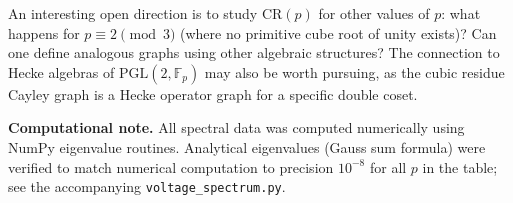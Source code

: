 \documentclass[11pt,a4paper]{article}
\theoremstyle{plain}
\theoremstyle{definition}
\theoremstyle{remark}
\newcommand{\F}{\mathbb{F}}
\newcommand{\CR}{\mathrm{CR}}
\begin{document}
An interesting open direction is to study $\CR(p)$ for other values of $p$:
what happens for $p \equiv 2 \pmod{3}$ (where no primitive cube root of unity
exists)? Can one define analogous graphs using other algebraic structures?
The connection to Hecke algebras of $\mathrm{PGL}(2, \F_p)$ may also be
worth pursuing, as the cubic residue Cayley graph is a Hecke operator graph
for a specific double coset.

\bigskip

{\raggedright\noindent\textbf{Computational note.}
All spectral data was computed numerically using NumPy eigenvalue routines.
Analytical eigenvalues (Gauss sum formula) were verified to match numerical
computation to precision $10^{-8}$ for all $p$ in the table; see the
accompanying \texttt{voltage\_spectrum.py}.\par}
\end{document}

